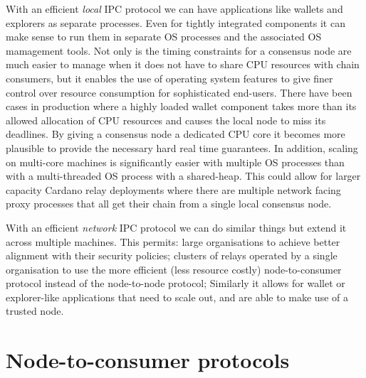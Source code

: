\documentclass{article}
\theoremstyle{definition}{
  \newtheorem{lemma}{Lemma}[section] %
  \newtheorem{definition}[lemma]{Definition}
}
\theoremstyle{theorem}{
  \newtheorem{invariant}[lemma]{Invariant}
  \newtheorem{proofobligation}[lemma]{Proof Obligation}
}
\numberwithin{equation}{lemma}
\begin{document}
With an efficient \emph{local} IPC protocol we can have applications
like wallets and explorers as separate processes. Even for tightly
integrated components it can make sense to run them in separate OS
processes and the associated OS mamagement tools. Not only is the
timing constraints for a consensus node are much easier to manage when
it does not have to share CPU resources with chain consumers, but it
enables the use of operating system features to give finer control
over resource consumption for sophisticated end-users.  There have
been cases in production where a highly loaded wallet component takes
more than its allowed allocation of CPU resources and causes the local
node to miss its deadlines.  By giving a consensus node a dedicated
CPU core it becomes more plausible to provide the necessary hard real
time guarantees. In addition, scaling on multi-core machines is
significantly easier with multiple OS processes than with a
multi-threaded OS process with a shared-heap. This could allow for
larger capacity Cardano relay deployments where there are multiple
network facing proxy processes that all get their chain from a single
local consensus node.

With an efficient \emph{network} IPC protocol we can do similar things
but extend it across multiple machines. This permits: large
organisations to achieve better alignment with their security
policies; clusters of relays operated by a single organisation to use
the more efficient (less resource costly) node-to-consumer protocol
instead of the node-to-node protocol; Similarly it allows for wallet
or explorer-like applications that need to scale out, and are able to
make use of a trusted node.


\section{Node-to-consumer protocols}
\end{document}
